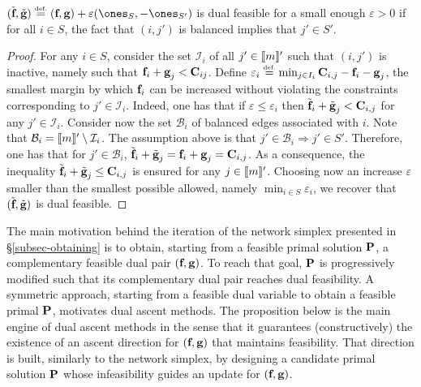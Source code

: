 \begin{prop}\label{prop-feasibility-dual-pair}
$(\tilde{\fD},\tilde{\gD})\eqdef(\fD,\gD)+\varepsilon(\ones_S,-\ones_{S'})$ is dual feasible for a small enough $\varepsilon>0$ if for all $i\in S$, the fact that $(i,j')$ is balanced implies that $j'\in S'$.
\end{prop}
\begin{proof}
For any $i\in S$, consider the set $\mathcal{I}_{i}$ of all $j'\in\range{m}'$ such that $(i,j')$ is inactive, namely such that $\fD_i+\gD_j<\C_{ij}$. Define $\varepsilon_i \eqdef \min_{j\in I_{i}} \C_{i,j}-\fD_i-\gD_j$, the smallest margin by which $\fD_i$ can be increased without violating the constraints corresponding to $j'\in \mathcal{I}_i$. Indeed, one has that if $\varepsilon\leq \varepsilon_i$ then $\tilde{\fD}_i+\tilde{\gD}_j<\C_{i,j}$ for any $j'\in \mathcal{I}_i$. Consider now the set $\mathcal{B}_i$ of balanced edges associated with $i$. Note that $\mathcal{B}_i=\range{m}'\setminus \mathcal{I}_i$. The assumption above is that $j'\in\mathcal{B}_i\Rightarrow j'\in S'$. Therefore, one has that for $j'\in\mathcal{B}_i$, $\tilde{\fD}_i+\tilde{\gD}_j=\fD_i+\gD_j=\C_{i,j}$. As a consequence, the inequality $\tilde{\fD}_i+\tilde{\gD}_j\leq \C_{i,j}$ is ensured for any $j\in \range{m}'$. Choosing now an increase $\varepsilon$ smaller than the smallest possible allowed, namely $\min_{i\in S} \varepsilon_i$, we recover that $(\tilde{\fD},\tilde{\gD})$ is dual feasible.
\end{proof}

The main motivation behind the iteration of the network simplex presented in \S\ref{subsec-obtaining} is to obtain, starting from a feasible primal solution $\P$, a complementary feasible dual pair $(\fD,\gD)$. To reach that goal, $\P$ is progressively modified such that its complementary dual pair reaches dual feasibility. A symmetric approach, starting from a feasible dual variable to obtain a feasible primal $\P$, motivates dual ascent methods. The proposition below is the main engine of dual ascent methods in the sense that it guarantees (constructively) the existence of an ascent direction for $(\fD,\gD)$ that maintains feasibility. That direction is built, similarly to the network simplex, by designing a candidate primal solution $\P$ whose infeasibility guides an update for $(\fD,\gD)$.

